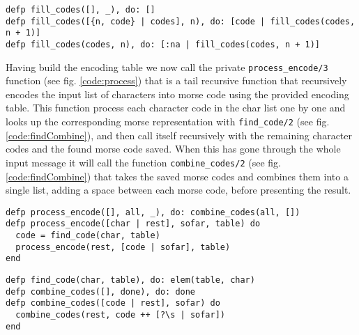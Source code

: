 \documentclass[a4paper,11pt]{article}
\newenvironment{code}{\captionsetup{type=listing}}{}
\begin{document}
\begin{code}
\label{code:fill}
\begin{verbatim}
defp fill_codes([], _), do: []
defp fill_codes([{n, code} | codes], n), do: [code | fill_codes(codes, n + 1)]
defp fill_codes(codes, n), do: [:na | fill_codes(codes, n + 1)]
\end{verbatim}
\end{code}

Having build the encoding table we now call the private {\tt process\_encode/3} function (see fig. \ref{code:process}) that is a tail recursive function that recursively 
encodes the input list of characters into morse code using the provided encoding table. This function process each character code in the char list
one by one and looks up the corresponding morse representation with {\tt find\_code/2} (see fig. \ref{code:findCombine}), and then call itself recursively with the remaining
character codes and the found morse code saved. When this has gone through the whole input message it will call the function 
{\tt combine\_codes/2} (see fig. \ref{code:findCombine}) that takes the saved morse codes and combines them into a single list, adding a space 
between each morse code, before presenting the result.   

\begin{code}
\label{code:process}
\begin{verbatim}
defp process_encode([], all, _), do: combine_codes(all, [])
defp process_encode([char | rest], sofar, table) do
  code = find_code(char, table)
  process_encode(rest, [code | sofar], table)
end
\end{verbatim}
\end{code}

\begin{code}
\label{code:findCombine}
\begin{verbatim}
defp find_code(char, table), do: elem(table, char)
defp combine_codes([], done), do: done
defp combine_codes([code | rest], sofar) do
  combine_codes(rest, code ++ [?\s | sofar])
end
\end{verbatim}
\end{code}
\end{document}
